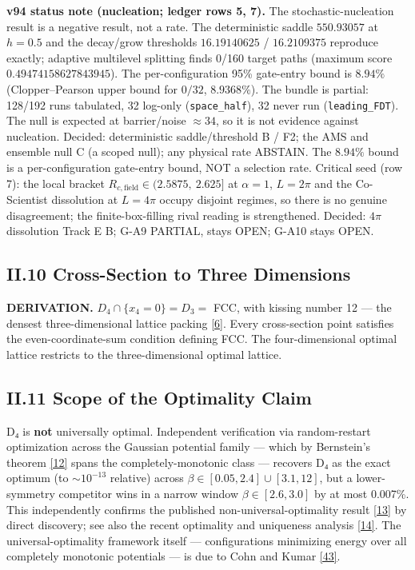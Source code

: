 \documentclass[a4paper,11pt]{article}
\begin{document}
\textbf{v94 status note (nucleation; ledger rows 5, 7).} The stochastic-nucleation result is a negative result, not a rate. The deterministic saddle $550.93057$ at $h=0.5$ and the decay/grow thresholds $16.19140625$ / $16.2109375$ reproduce exactly; adaptive multilevel splitting finds 0/160 target paths (maximum score $0.49474158627843945$). The per-configuration 95\% gate-entry bound is $8.94\%$ (Clopper--Pearson upper bound for $0/32$, $8.9368\%$). The bundle is partial: 128/192 runs tabulated, 32 log-only (\texttt{space\_half}), 32 never run (\texttt{leading\_FDT}). The null is expected at barrier/noise $\approx34$, so it is not evidence against nucleation. Decided: deterministic saddle/threshold B / F2; the AMS and ensemble null C (a scoped null); any physical rate ABSTAIN. The $8.94\%$ bound is a per-configuration gate-entry bound, NOT a selection rate. Critical seed (row 7): the local bracket $R_{c,\mathrm{field}}\in(2.5875,\ 2.625]$ at $\alpha=1$, $L=2\pi$ and the Co-Scientist dissolution at $L=4\pi$ occupy disjoint regimes, so there is no genuine disagreement; the finite-box-filling rival reading is strengthened. Decided: $4\pi$ dissolution Track E B; G-A9 PARTIAL, stays OPEN; G-A10 stays OPEN.

\subsection*{II.10 Cross-Section to Three Dimensions}

\textbf{DERIVATION.} $D_4\cap\{x_4=0\}=D_3=$ FCC, with kissing number 12 — the densest three-dimensional lattice packing \hyperref[ref6]{[6]}. Every cross-section point satisfies the even-coordinate-sum condition defining FCC. The four-dimensional optimal lattice restricts to the three-dimensional optimal lattice.

\subsection*{II.11 Scope of the Optimality Claim}

D₄ is \textbf{not} universally optimal. Independent verification via random-restart optimization across the Gaussian potential family — which by Bernstein's theorem \hyperref[ref12]{[12]} spans the completely-monotonic class — recovers D₄ as the exact optimum (to $\sim10^{-13}$ relative) across $\beta\in[0.05,2.4]\cup[3.1,12]$, but a lower-symmetry competitor wins in a narrow window $\beta\in[2.6,3.0]$ by at most 0.007\%. This independently confirms the published non-universal-optimality result \hyperref[ref13]{[13]} by direct discovery; see also the recent optimality and uniqueness analysis \hyperref[ref14]{[14]}. The universal-optimality framework itself — configurations minimizing energy over all completely monotonic potentials — is due to Cohn and Kumar \hyperref[ref43]{[43]}.
\end{document}
